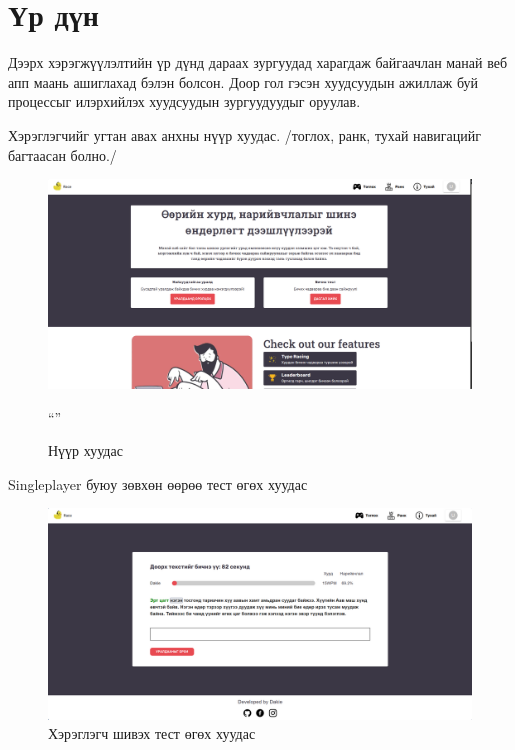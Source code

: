 \section{Үр дүн}

Дээрх хэрэгжүүлэлтийн үр дүнд дараах зургуудад харагдаж байгаачлан манай веб апп маань ашиглахад бэлэн болсон. Доор гол гэсэн хуудсуудын ажиллаж буй процессыг илэрхийлэх хуудсуудын зургуудуудыг оруулав.
\clearpage


Хэрэглэгчийг угтан авах анхны нүүр хуудас. /тоглох, ранк, тухай навигацийг багтаасан болно./
\begin{figure}[h]
	\centering
	\includegraphics[width=13cm]{images/result/homepage.png}
	\caption{Нүүр хуудас}
	\label{fig:results}``''
\end{figure}

Singleplayer буюу зөвхөн өөрөө тест өгөх хуудас
\begin{figure}[h]
	\centering
	\includegraphics[width=13cm]{images/result/playpage.png}
	\caption{Хэрэглэгч шивэх тест өгөх хуудас}
	\label{fig:results}
\end{figure}

